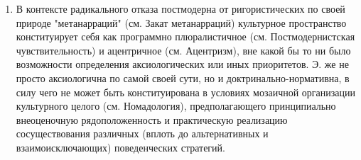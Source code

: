 \documentclass[12pt]{article}
\begin{document}
\begin{enumerate}
  \item В контексте радикального отказа постмодерна
от  ригористических  по  своей  природе  "метанарраций"  (см.  Закат  метанарраций)  культурное  пространство
конституирует себя как программно плюралистичное (см. Постмодернистская чувствительность) и ацентричное
(см. Ацентризм), вне какой бы то ни было возможности определения аксиологических или иных приоритетов.
Э. же не просто аксиологична по самой своей сути, но и доктринально-нормативна, в силу чего не может быть
конституирована в условиях мозаичной организации культурного целого (см. Номадология), предполагающего
принципиально  внеоценочную  рядоположенность  и  практическую  реализацию  сосуществования  различных
(вплоть до альтернативных и взаимоисключающих) поведенческих стратегий.


\end{enumerate}
\end{document}
